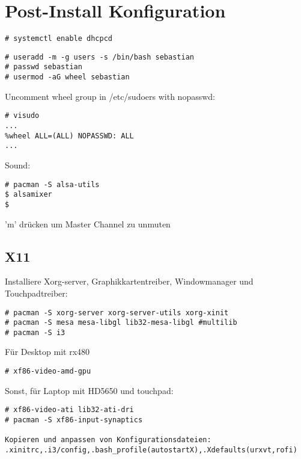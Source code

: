 \section{Post-Install Konfiguration}
\begin{lstlisting}[style=Bash]
# systemctl enable dhcpcd
\end{lstlisting}
\begin{lstlisting}[style=Bash]
# useradd -m -g users -s /bin/bash sebastian 
# passwd sebastian
# usermod -aG wheel sebastian
\end{lstlisting}
Uncomment wheel group in /etc/sudoers with nopasswd:
\begin{lstlisting}[style=Bash]
# visudo 
...
%wheel ALL=(ALL) NOPASSWD: ALL
...

\end{lstlisting}
Sound:
\begin{lstlisting}[style=Bash]
# pacman -S alsa-utils 
$ alsamixer
$
\end{lstlisting}
'm' drücken um Master Channel zu unmuten

\subsection{X11}
\label{sec:x11}
Installiere Xorg-server, Graphikkartentreiber, Windowmanager und Touchpadtreiber:
\begin{lstlisting}[style=Bash]
# pacman -S xorg-server xorg-server-utils xorg-xinit 
# pacman -S mesa mesa-libgl lib32-mesa-libgl #multilib
# pacman -S i3
\end{lstlisting}
Für Desktop mit rx480
\begin{lstlisting}[style=Bash]
# xf86-video-amd-gpu 
\end{lstlisting}
Sonst, für Laptop mit HD5650 und touchpad:
\begin{lstlisting}[style=Bash]
# xf86-video-ati lib32-ati-dri
# pacman -S xf86-input-synaptics

Kopieren und anpassen von Konfigurationsdateien:
.xinitrc,.i3/config,.bash_profile(autostartX),.Xdefaults(urxvt,rofi)
\end{lstlisting}



